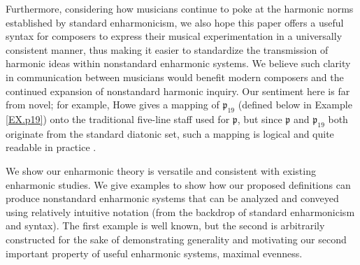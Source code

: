 \documentclass{article}
\theoremstyle{plain}
\theoremstyle{definition}
\theoremstyle{remark}
\begin{document}
Furthermore, considering how musicians continue to poke at the harmonic norms established by standard enharmonicism, we also hope this paper offers a useful syntax for composers to express their musical experimentation in a universally consistent manner, thus making it easier to standardize the transmission of harmonic ideas within nonstandard enharmonic systems. We believe such clarity in communication between musicians would benefit modern composers and the continued expansion of nonstandard harmonic inquiry. Our sentiment here is far from novel; for example, Howe gives a mapping of $\mathfrak{p}_{19}$ (defined below in Example \ref{EX.p19}) onto the traditional five-line staff used for $\mathfrak{p}$, but since $\mathfrak{p}$ and $\mathfrak{p}_{19}$ both originate from the standard diatonic set, such a mapping is logical and quite readable in practice \cite{Howe}.

We show our enharmonic theory is versatile and consistent with existing enharmonic studies. We give examples to show how our proposed definitions can produce nonstandard enharmonic systems that can be analyzed and conveyed using relatively intuitive notation (from the backdrop of standard enharmonicism and syntax). The first example is well known, but the second is arbitrarily constructed for the sake of demonstrating generality and motivating our second important property of useful enharmonic systems, maximal evenness.
\end{document}
